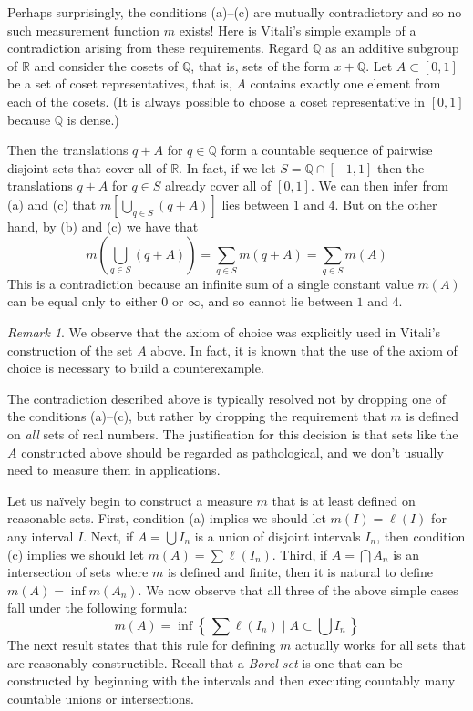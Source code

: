 \documentclass[11pt,oneside]{amsart}
\newcommand{\set}[1]{\left\{\,#1\,\right\}}
\newcommand{\QQ}{\mathbb Q}
\newcommand{\RR}{\mathbb R}
\theoremstyle{definition}
\theoremstyle{definition}
\theoremstyle{remark}
\newtheorem{rem}[thm]{Remark}
\begin{document}
Perhaps surprisingly, the conditions (a)--(c) are mutually contradictory and so no such measurement function $m$ exists! Here is Vitali's simple example of a contradiction arising from these requirements. Regard $\QQ$ as an additive subgroup of $\RR$ and consider the cosets of $\QQ$, that is, sets of the form $x+\QQ$. Let $A\subset[0,1]$ be a set of coset representatives, that is, $A$ contains exactly one element from each of the cosets. (It is always possible to choose a coset representative in $[0,1]$ because $\QQ$ is dense.)

Then the translations $q+A$ for $q\in\QQ$ form a countable sequence of pairwise disjoint sets that cover all of $\RR$. In fact, if we let $S=\QQ\cap[-1,1]$ then the translations $q+A$ for $q\in S$ already cover all of $[0,1]$. We can then infer from (a) and (c) that $m[\bigcup_{q\in S}(q+A)]$ lies between $1$ and $4$. But on the other hand, by (b) and (c) we have that 
\[m\left(\bigcup_{q\in S}(q+A)\right)=\sum_{q\in S}m(q+A)=\sum_{q\in S}m(A)
\]
This is a contradiction because an infinite sum of a single constant value $m(A)$ can be equal only to either $0$ or $\infty$, and so cannot lie between $1$ and $4$.

\begin{rem}
  We observe that the axiom of choice was explicitly used in Vitali's construction of the set $A$ above. In fact, it is known that the use of the axiom of choice is necessary to build a counterexample.
\end{rem}

The contradiction described above is typically resolved not by dropping one of the conditions (a)--(c), but rather by dropping the requirement that $m$ is defined on \emph{all} sets of real numbers. The justification for this decision is that sets like the $A$ constructed above should be regarded as pathological, and we don't usually need to measure them in applications.

Let us na\"ively begin to construct a measure $m$ that is at least defined on reasonable sets. First, condition (a) implies we should let $m(I)=\ell(I)$ for any interval $I$. Next, if $A=\bigcup I_n$ is a union of disjoint intervals $I_n$, then condition (c) implies we should let $m(A)=\sum\ell(I_n)$. Third, if $A=\bigcap A_n$ is an intersection of sets where $m$ is defined and finite, then it is natural to define $m(A)=\inf m(A_n)$. We now observe that all three of the above simple cases fall under the following formula:
\[m(A)=\inf\set{\sum\ell(I_n)\mid A\subset\bigcup I_n}
\]
The next result states that this rule for defining $m$ actually works for all sets that are reasonably constructible. Recall that a \emph{Borel set} is one that can be constructed by beginning with the intervals and then executing countably many countable unions or intersections.
\end{document}
